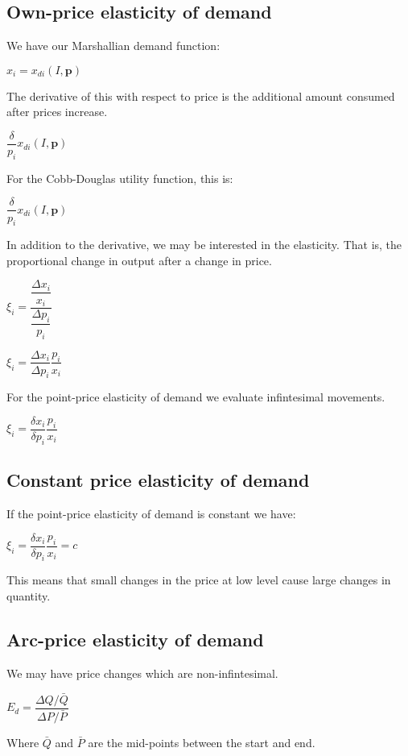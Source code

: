 
\subsection{Own-price elasticity of demand}

We have our Marshallian demand function:

\(x_i=x_{di}(I, \mathbf p)\)

The derivative of this with respect to price is the additional amount consumed after prices increase.

\(\dfrac{\delta }{p_i}x_{di}(I, \mathbf p)\)

For the Cobb-Douglas utility function, this is:

\(\dfrac{\delta }{p_i}x_{di}(I, \mathbf p)\)

In addition to the derivative, we may be interested in the elasticity. That is, the proportional change in output after a change in price.

\(\xi_i =\dfrac{\dfrac{\Delta x_i}{x_i}}{\dfrac{\Delta p_i}{p_i}}\)

\(\xi_i =\dfrac{\Delta x_i}{\Delta p_i}\dfrac{p_i}{x_i}\)

For the point-price elasticity of demand we evaluate infintesimal movements.

\(\xi_i =\dfrac{\delta x_i}{\delta p_i}\dfrac{p_i}{x_i}\)

\subsection{Constant price elasticity of demand}

If the point-price elasticity of demand is constant we have:

\(\xi_i =\dfrac{\delta x_i}{\delta p_i}\dfrac{p_i}{x_i}=c\)

This means that small changes in the price at low level cause large changes in quantity.

\subsection{Arc-price elasticity of demand}

We may have price changes which are non-infintesimal.

\(E_d=\dfrac{\Delta Q/\bar Q}{\Delta P/\bar P}\)

Where \(\bar Q\) and \(\bar P\) are the mid-points between the start and end.

